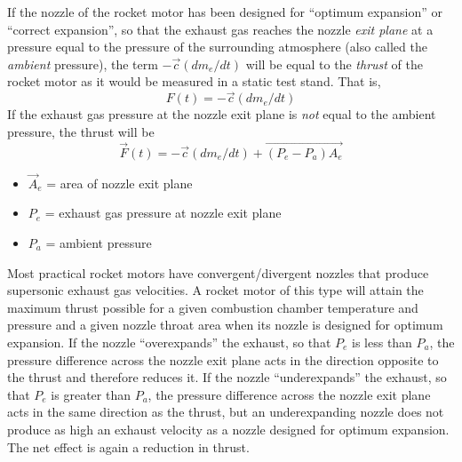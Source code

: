 If the nozzle of the rocket motor has been designed for ``optimum expansion'' or ``correct expansion'', so
that the exhaust gas reaches the nozzle \emph{exit plane} at a pressure equal to the pressure of the
surrounding atmosphere (also called the \emph{ambient} pressure), the term $-\vec{c}(dm_e/dt)$ will be equal
to the \emph{thrust} of the rocket motor as it would be measured in a static test stand. That is,
\begin{equation*}\tag{7a}
F(t) = -\vec{c}(dm_e/dt)
\end{equation*}
If the exhaust gas pressure at the nozzle exit plane is \emph{not} equal to the ambient pressure, the thrust
will be
\begin{equation*}\tag{7b}
\vec{F}(t) = -\vec{c}(dm_e/dt) + \overrightarrow{(P_e - P_a)A_e}
\end{equation*}
\begin{itemize}[nosep,leftmargin=4em,labelwidth=3.5em,labelsep=0.5em,align=left]
  \item[Where] $\vec{A}_e$ = area of nozzle exit plane
  \item[] $P_e$ = exhaust gas pressure at nozzle exit plane
  \item[and] $P_a$ = ambient pressure
\end{itemize}
\medskip

Most practical rocket motors have convergent/divergent nozzles that produce supersonic exhaust gas
velocities. A rocket motor of this type will attain the maximum thrust possible for a given combustion
chamber temperature and pressure and a given nozzle throat area when its nozzle is designed for optimum
expansion. If the nozzle ``overexpands'' the exhaust, so that $P_e$ is less than $P_a$, the pressure
difference across the nozzle exit plane acts in the direction opposite to the thrust and therefore reduces
it. If the nozzle ``underexpands'' the exhaust, so that $P_e$ is greater than $P_a$, the pressure difference
across the nozzle exit plane acts in the same direction as the thrust, but an underexpanding nozzle does not
produce as high an exhaust velocity as a nozzle designed for optimum expansion. The net effect is again a
reduction in thrust.

